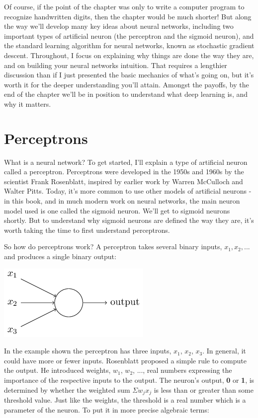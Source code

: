 \documentclass[a4paper,12pt]{report}%
\begin{document}
Of course, if the point of the chapter was only to write a computer program to recognize handwritten digits, then the chapter would be much shorter! But along the way we'll develop many key ideas about neural networks, including two important types of artificial neuron (the perceptron and the sigmoid neuron), and the standard learning algorithm for neural networks, known as stochastic gradient descent. Throughout, I focus on explaining why things are done the way they are, and on building your neural networks intuition. That requires a lengthier discussion than if I just presented the basic mechanics of what's going on, but it's worth it for the deeper understanding you'll attain. Amongst the payoffs, by the end of the chapter we'll be in position to understand what deep learning is, and why it matters.

\section{Perceptrons}
What is a neural network? To get started, I'll explain a type of artificial neuron called a perceptron. Perceptrons were developed in the 1950s and 1960s by the scientist Frank Rosenblatt, inspired by earlier work by Warren McCulloch and Walter Pitts. Today, it's more common to use other models of artificial neurons - in this book, and in much modern work on neural networks, the main neuron model used is one called the sigmoid neuron. We'll get to sigmoid neurons shortly. But to understand why sigmoid neurons are defined the way they are, it's worth taking the time to first understand perceptrons.

So how do perceptrons work? A perceptron takes several binary inputs, $x_{1}, x_{2}, ... $ and produces a single binary output:

\begin{center}
 \includegraphics[width=0.7\linewidth]{images/tikz0.png}
\end{center}

In the example shown the perceptron has three inputs, $x_{1}$, $x_{2}$, $ x_{3}$. In general, it could have more or fewer inputs. Rosenblatt proposed a simple rule to compute the output. He introduced weights, $w_{1}$, $w_{2}$, ...,  real numbers expressing the importance of the respective inputs to the output. The neuron's output, {\bf 0} or {\bf 1}, is determined by whether the weighted sum $\Sigma w_{j} x_{j}$ is less than or greater than some threshold value. Just like the weights, the threshold is a real number which is a parameter of the neuron. To put it in more precise algebraic terms:
\end{document}
